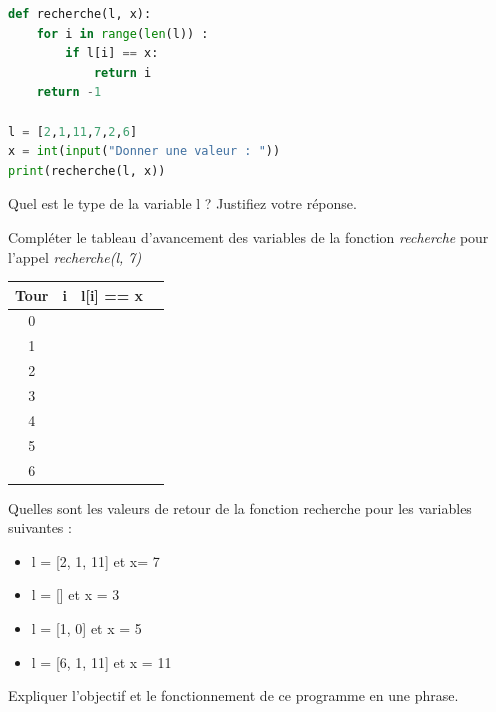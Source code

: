 \begin{Exercise}[title={Recherche linéaire}]

\begin{lstlisting}[style=pythonstyle, language=Python]
def recherche(l, x):
    for i in range(len(l)) :
        if l[i] == x:
            return i
    return -1

l = [2,1,11,7,2,6]
x = int(input("Donner une valeur : "))
print(recherche(l, x))
\end{lstlisting}

\Question Quel est le type de la variable l ? Justifiez votre réponse. \\
\emptybox{1cm}

\Question Compléter le tableau d'avancement des variables de la fonction \textit{recherche} pour l'appel \textit{recherche(l, 7)} \\

\begin{center}
\large
\begin{tabular}{c|c|c|c|}
\textbf{Tour} & \textbf{i} & \textbf{l[i] == x}  \\
\hline
0 &  &  &  \\
1 &  &  &  \\
2 &  &  &  \\
3 &  &  &  \\
4 &  &  &  \\
5 &  &  &  \\
6 &  &  &  \\
\end{tabular}
\end{center}

\Question Quelles sont les valeurs de retour de la fonction recherche pour les variables suivantes : \\
\begin{itemize}
    \item l = [2, 1, 11] et x= 7
    \item l = [] et x = 3
    \item l = [1, 0] et x = 5
    \item l = [6, 1, 11] et x = 11
\end{itemize}

\Question Expliquer l'objectif et le fonctionnement de ce programme en une phrase.\\

\end{Exercise}

